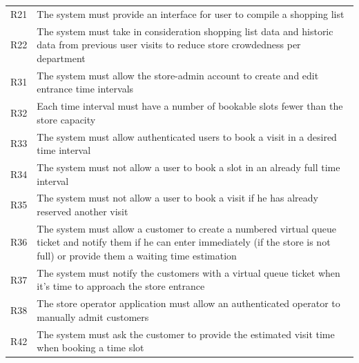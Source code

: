 \begin{tabular}{C{1cm}L{14.1cm}}
    R21   & The system must provide an interface for user to compile a shopping list                                                                                                                    \\
    R22   & The system must take in consideration shopping list data and historic data from previous user visits to reduce store crowdedness per department                                             \\
    R31   & The system must allow the store-admin account to create and edit entrance time intervals                                                                                                    \\
    R32   & Each time interval must have a number of bookable slots fewer than the store capacity                                                                                                       \\
    R33   & The system must allow authenticated users to book a visit in a desired time interval                                                                                                        \\
    R34   & The system must not allow a user to book a slot in an already full time interval                                                                                                            \\
    R35   & The system must not allow a user to book a visit if he has already reserved another visit                                                                                                   \\
    R36   & The system must allow a customer to create a numbered virtual queue ticket and notify them if he can enter immediately (if the store is not full) or provide them a waiting time estimation \\
    R37   & The system must notify the customers with a virtual queue ticket when it's time to approach the store entrance                                                                              \\
    R38   & The store operator application must allow an authenticated operator to manually admit customers                                                                                             \\
    R42   & The system  must ask the customer to provide the estimated visit time when booking a time slot                                                                                              \\
\end{tabular}

